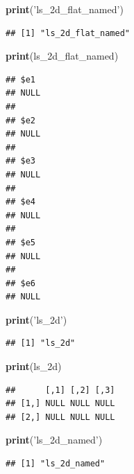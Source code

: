\documentclass[
]{book}
\newenvironment{Shaded}{\begin{snugshade}}{\end{snugshade}}
\newcommand{\KeywordTok}[1]{\textcolor[rgb]{0.13,0.29,0.53}{\textbf{#1}}}
\newcommand{\NormalTok}[1]{#1}
\newcommand{\StringTok}[1]{\textcolor[rgb]{0.31,0.60,0.02}{#1}}
\begin{document}
\begin{Shaded}
\begin{Highlighting}[]
\KeywordTok{print}\NormalTok{(}\StringTok{'ls_2d_flat_named'}\NormalTok{)}
\end{Highlighting}
\end{Shaded}

\begin{verbatim}
## [1] "ls_2d_flat_named"
\end{verbatim}

\begin{Shaded}
\begin{Highlighting}[]
\KeywordTok{print}\NormalTok{(ls_2d_flat_named)}
\end{Highlighting}
\end{Shaded}

\begin{verbatim}
## $e1
## NULL
## 
## $e2
## NULL
## 
## $e3
## NULL
## 
## $e4
## NULL
## 
## $e5
## NULL
## 
## $e6
## NULL
\end{verbatim}

\begin{Shaded}
\begin{Highlighting}[]
\KeywordTok{print}\NormalTok{(}\StringTok{'ls_2d'}\NormalTok{)}
\end{Highlighting}
\end{Shaded}

\begin{verbatim}
## [1] "ls_2d"
\end{verbatim}

\begin{Shaded}
\begin{Highlighting}[]
\KeywordTok{print}\NormalTok{(ls_2d)}
\end{Highlighting}
\end{Shaded}

\begin{verbatim}
##      [,1] [,2] [,3]
## [1,] NULL NULL NULL
## [2,] NULL NULL NULL
\end{verbatim}

\begin{Shaded}
\begin{Highlighting}[]
\KeywordTok{print}\NormalTok{(}\StringTok{'ls_2d_named'}\NormalTok{)}
\end{Highlighting}
\end{Shaded}

\begin{verbatim}
## [1] "ls_2d_named"
\end{verbatim}
\end{document}
